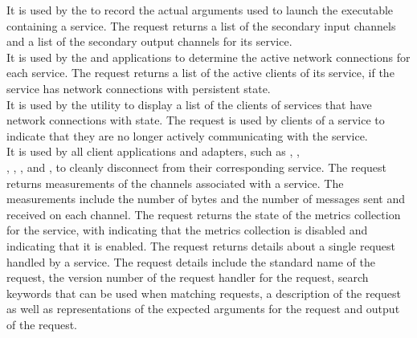 It is used by the \emph{\MMMU} to record the actual arguments used to launch the
executable containing a service.
The  request returns a list of the secondary input
channels and a list of the secondary output channels for its service.\\

It is used by the  and \emph{\MMMU} applications to
determine the active \yarp{} network connections for each service.
The  request returns a list of the active clients of
its service, if the service has \yarp{} network connections with persistent state.\\

It is used by the  utility to display a list of the clients
of services that have \yarp{} network connections with state.
The  request is used by clients of a service to
indicate that they are no longer actively communicating with the service.\\

It is used by all client applications and adapters, such as
,
,\\
, ,
,
 and
, to cleanly disconnect from their
corresponding service.
The  request returns measurements of the channels
associated with a service.
The measurements include the number of bytes and the number of messages sent and
received on each channel.
The  request returns the state of the metrics
collection for the service, with  indicating that the metrics collection is
disabled and  indicating that it is enabled.
The  request returns details about a single request
handled by a service.
The request details include the standard name of the request, the version number of the
request handler for the request, search keywords that can be used when matching requests,
a description of the request as well as representations of the expected arguments for the
request and output of the request.\\

